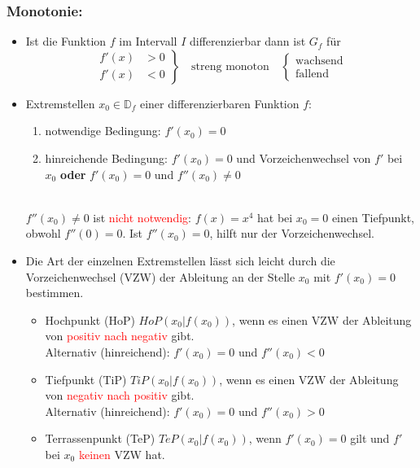  \subsubsection{Monotonie:}
 \begin{itemize}
 \item Ist die Funktion $f$ im Intervall $I$ differenzierbar dann ist $G_f$ für  
 \begin{equation*}
	\left.\begin{aligned}
	f'(x) &>0  \\
	f'(x) &<0
	\end{aligned}
	\right\}
\quad \text{streng monoton}
	\quad\left\{\begin{aligned}
	\text{wachsend}\\
	\text{fallend}
	\end{aligned}
\right.
\end{equation*} 
\item \mynote Extremstellen $x_0 \in \mathds{D}_f$ einer differenzierbaren Funktion $f$:\\
\begin{enumerate} \item notwendige Bedingung: $f'(x_0)=0$\\
\item hinreichende Bedingung: $f'(x_0)=0$ und Vorzeichenwechsel von $f'$ bei $x_0$ \textbf{oder} $f'(x_0)=0$ und $f''(x_0) \neq 0$
\end{enumerate}\\
\mynote $f''(x_0)\neq 0$ ist \textcolor{red}{nicht notwendig}: $f(x)=x^4$ hat bei $x_0=0$ einen Tiefpunkt, obwohl $f''(0)=0$. Ist $f''(x_0)=0$, hilft nur der Vorzeichenwechsel.
\item Die Art der einzelnen Extremstellen lässt sich leicht durch die Vorzeichenwechsel (VZW) der Ableitung an der Stelle $x_0$ mit $f'(x_0)=0$ bestimmen.
 \begin{itemize}
\item Hochpunkt (HoP) $HoP(x_0|f(x_0))$, wenn es einen VZW der Ableitung von \textcolor{red}{positiv nach negativ} gibt.\\ Alternativ (hinreichend): $f'(x_0) = 0$ und $f''(x_0) < 0$
\item Tiefpunkt (TiP) $TiP(x_0|f(x_0))$, wenn es einen VZW der Ableitung von \textcolor{red}{negativ nach positiv} gibt.\\ Alternativ (hinreichend): $f'(x_0) = 0$ und $f''(x_0) > 0$
\item Terrassenpunkt (TeP) $TeP(x_0|f(x_0))$, wenn $f'(x_0)=0$ gilt und $f'$ bei $x_0$ \textcolor{red}{keinen} VZW hat.

\end{itemize}
\end{itemize}
